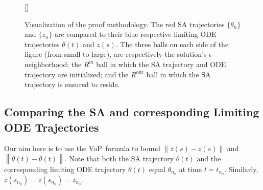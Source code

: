 \documentclass[usenames,dvipsnames,final,12pt]{colt2018} %
\newcommand{\vop}{VoP}
\newcommand{\bart}{\bar{\theta}}
\newcommand{\barz}{\bar{z}}
\newcommand{\tI}[1]{t_{#1}}
\newcommand{\sI}[1]{s_{#1}}
\newcommand{\norm}[1]{\left\lVert#1\right\rVert}
\begin{document}
%
\begin{figure}
[\FBwidth]
{\caption{Visualization of the proof methodology. The red SA trajectories $\{\theta_n\}$ and $\{z_n\}$ are compared  to their blue respective limiting ODE trajectories $\theta(t)$ and $z(s)$. The three balls on each side of the figure (from small to large), are respectively the solution's $\epsilon$-neighborhood; the $R^{\text{in}}$ ball in which the SA trajectory and ODE trajectory are initialized; and the $R^{\text{out}}$ ball in which the SA trajectory is ensured to reside.
	  } \label{fig:trajectory} }
	{%
\hspace{-4ex}
		\def\svgscale{0.52}
		 \hspace{-2ex}}
\end{figure}


\subsection{Comparing the SA and corresponding Limiting ODE Trajectories}
\label{subsec:Comparison}

Our aim here is to use the \vop\ formula to bound $\norm{\barz(s) - z(s)}$ and $\norm{\bart(t) - \theta(t)}$. Note that both the SA trajectory $\bart(t)$ and the corresponding limiting ODE trajectory $\theta(t)$ equal $\theta_{n_0}$ at time $t = \tI{n_0}.$ Similarly, $\barz(\sI{n_0}) = z(\sI{n_0}) = z_{n_0}.$
\end{document}
